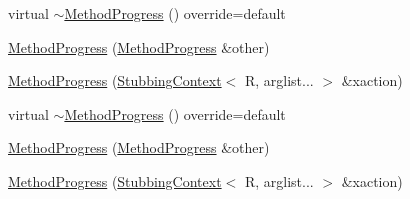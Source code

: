 \begin{DoxyCompactItemize}
\item 
virtual \mbox{\hyperlink{structfakeit_1_1WhenFunctor_1_1MethodProgress_a5bdc18cb6924dc88bc110a15aac37455}{$\sim$\+Method\+Progress}} () override=default
\item 
\mbox{\hyperlink{structfakeit_1_1WhenFunctor_1_1MethodProgress_a1a3992d9bc7c283acb9aa657ab207fc1}{Method\+Progress}} (\mbox{\hyperlink{structfakeit_1_1WhenFunctor_1_1MethodProgress}{Method\+Progress}} \&other)
\item 
\mbox{\hyperlink{structfakeit_1_1WhenFunctor_1_1MethodProgress_ab62da1d9cf787ea91795f61f3b76ac25}{Method\+Progress}} (\mbox{\hyperlink{structfakeit_1_1StubbingContext}{Stubbing\+Context}}$<$ R, arglist... $>$ \&xaction)
\item 
virtual \mbox{\hyperlink{structfakeit_1_1WhenFunctor_1_1MethodProgress_a5bdc18cb6924dc88bc110a15aac37455}{$\sim$\+Method\+Progress}} () override=default
\item 
\mbox{\hyperlink{structfakeit_1_1WhenFunctor_1_1MethodProgress_a1a3992d9bc7c283acb9aa657ab207fc1}{Method\+Progress}} (\mbox{\hyperlink{structfakeit_1_1WhenFunctor_1_1MethodProgress}{Method\+Progress}} \&other)
\item 
\mbox{\hyperlink{structfakeit_1_1WhenFunctor_1_1MethodProgress_ab62da1d9cf787ea91795f61f3b76ac25}{Method\+Progress}} (\mbox{\hyperlink{structfakeit_1_1StubbingContext}{Stubbing\+Context}}$<$ R, arglist... $>$ \&xaction)
\end{DoxyCompactItemize}
